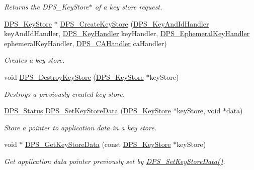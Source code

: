 \begin{DoxyCompactItemize}
\begin{DoxyCompactList}\small\item\em Returns the {\ttfamily D\+P\+S\+\_\+\+Key\+Store$\ast$} of a key store request. \end{DoxyCompactList}\item 
\hyperlink{group__keystore_gaf3833cfe48f848f698514bc5daa075fa}{D\+P\+S\+\_\+\+Key\+Store} $\ast$ \hyperlink{group__keystore_gafa79de23848ff56d0cced67897313369}{D\+P\+S\+\_\+\+Create\+Key\+Store} (\hyperlink{group__keystore_ga83d3ade4f4acd7d4385d606270ddfd29}{D\+P\+S\+\_\+\+Key\+And\+Id\+Handler} key\+And\+Id\+Handler, \hyperlink{group__keystore_gaccf7e3d43bc1e586132d7f1ae03d02f7}{D\+P\+S\+\_\+\+Key\+Handler} key\+Handler, \hyperlink{group__keystore_ga5b4cf102912eea802196d3e307c399ef}{D\+P\+S\+\_\+\+Ephemeral\+Key\+Handler} ephemeral\+Key\+Handler, \hyperlink{group__keystore_ga0acd005f34bca4fcbe1c460e2305ddae}{D\+P\+S\+\_\+\+C\+A\+Handler} ca\+Handler)
\begin{DoxyCompactList}\small\item\em Creates a key store. \end{DoxyCompactList}\item 
void \hyperlink{group__keystore_ga40bea030ef0ba65ec332880ae2bbfee1}{D\+P\+S\+\_\+\+Destroy\+Key\+Store} (\hyperlink{group__keystore_gaf3833cfe48f848f698514bc5daa075fa}{D\+P\+S\+\_\+\+Key\+Store} $\ast$key\+Store)
\begin{DoxyCompactList}\small\item\em Destroys a previously created key store. \end{DoxyCompactList}\item 
\hyperlink{group__status_ga30395a84d3cad9d4ec29848106415038}{D\+P\+S\+\_\+\+Status} \hyperlink{group__keystore_gaf8062875af6cab5caabc3f13bf995807}{D\+P\+S\+\_\+\+Set\+Key\+Store\+Data} (\hyperlink{group__keystore_gaf3833cfe48f848f698514bc5daa075fa}{D\+P\+S\+\_\+\+Key\+Store} $\ast$key\+Store, void $\ast$data)
\begin{DoxyCompactList}\small\item\em Store a pointer to application data in a key store. \end{DoxyCompactList}\item 
void $\ast$ \hyperlink{group__keystore_ga3b67d7dde74267ee9342dc3efd33812b}{D\+P\+S\+\_\+\+Get\+Key\+Store\+Data} (const \hyperlink{group__keystore_gaf3833cfe48f848f698514bc5daa075fa}{D\+P\+S\+\_\+\+Key\+Store} $\ast$key\+Store)
\begin{DoxyCompactList}\small\item\em Get application data pointer previously set by \hyperlink{group__keystore_gaf8062875af6cab5caabc3f13bf995807}{D\+P\+S\+\_\+\+Set\+Key\+Store\+Data()}. \end{DoxyCompactList}\end{DoxyCompactItemize}
